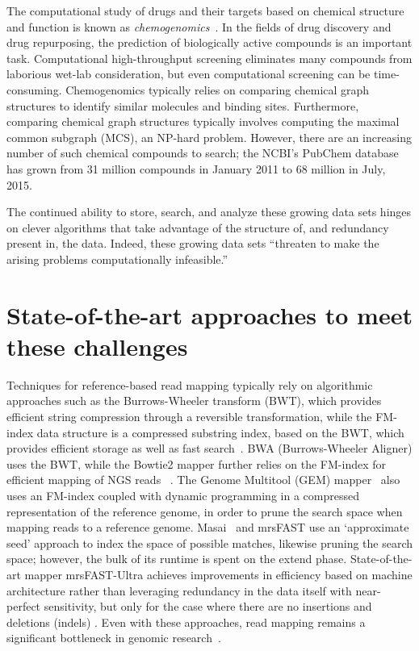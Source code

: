 \documentclass{acm_proc_article-sp}
\begin{document}
The computational study of drugs and their targets based on chemical structure and function
is known as \emph{chemogenomics}~\cite{bredel2004chemogenomics}.
In the fields of drug discovery and drug repurposing, the prediction 
of biologically active compounds is an important task. 
Computational high-throughput screening eliminates many compounds from 
laborious wet-lab consideration, but even computational screening can be 
time-consuming.
Chemogenomics typically relies on comparing chemical graph structures to identify
similar molecules and binding sites.
Furthermore, comparing chemical graph structures typically involves computing
the maximal common subgraph (MCS), an NP-hard problem.
However, there are an increasing number of such chemical compounds
to search; the NCBI's PubChem database has grown from 31 million compounds in
January 2011 to 68 million in July, 2015.

The continued ability to store, search, and analyze these growing data sets hinges on
clever algorithms that take advantage of the structure of, and redundancy 
present in, the data.
Indeed, these growing data sets ``threaten to make the arising problems 
computationally infeasible.''~\cite{berger2013computational}

\section{State-of-the-art approaches to meet these challenges}

Techniques for reference-based read mapping typically rely on algorithmic 
approaches such as the Burrows-Wheeler transform (BWT), 
which provides efficient string 
compression through a reversible transformation, while the FM-index data 
structure is a compressed substring index, 
based on the BWT, which provides efficient storage as well as fast search~\cite{berger2013computational}.
BWA (Burrows-Wheeler Aligner) uses the BWT, while the 
Bowtie2 mapper further relies on the FM-index for 
efficient mapping of NGS reads~\cite{berger2013computational} .
The Genome Multitool (GEM) mapper~\cite{marco2012gem} also uses an FM-index 
coupled with dynamic programming in a compressed representation of the 
reference genome, in order to prune the search space 
when mapping reads to a reference genome.
Masai~\cite{siragusa2013fast} and mrsFAST \cite{hach2010mrsfast} use an `approximate seed' approach to index
the space of possible matches, likewise pruning the search space; however, the
bulk of its runtime is spent on the extend phase.
State-of-the-art mapper mrsFAST-Ultra achieves improvements in efficiency based on machine architecture rather than leveraging redundancy in the data itself with near-perfect sensitivity, but
only for the case where there are no insertions and deletions (indels) \cite{hach2014mrsfast}.
Even with these approaches, read mapping remains a significant bottleneck in
genomic research~\cite{berger2013computational}.
\end{document}
